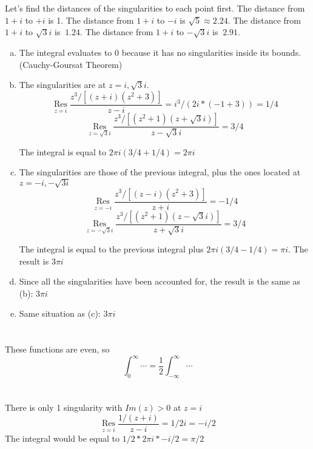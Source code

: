 \documentclass[12pt]{article}
\begin{document}
\section{}
Let's find the distances of the singularities to each point first. The distance from $ 1+i $ to $ +i $ is 1. The distance from $ 1+i $ to $ -i $ is $ \sqrt{5} \approx 2.24 $. The distance from $ 1+i $ to $ \sqrt{3}i $ is $ ~1.24 $. The distance from $ 1+i $ to $ -\sqrt{3}i $ is $ ~2.91 $. 
\begin{enumerate}[(a)]
	\item The integral evaluates to 0 because it has no singularities inside its bounds. (Cauchy-Goursat Theorem)
	
	\item The singularities are at $ z = i, \sqrt{3}i $. 
	\[ \operatorname{Res}\limits_{z=i} \dfrac{z^3/ \left[(z+i)(z^2 + 3)\right]}{z-i} = i^3 / \left(2i * (-1 + 3)\right) = 1 / 4\]
	\[ \operatorname{Res}\limits_{z=\sqrt{3}i} \dfrac{z^3/ \left[(z^2+1)(z + \sqrt{3}i)\right]}{z-\sqrt{3}i} = 3/4 \]
	
	The integral is equal to $ 2\pi i (3/4 + 1/4) = 2\pi i$
	
	\item The singularities are those of the previous integral, plus the ones located at $ z = -i, -\sqrt{3i} $
	\[ \operatorname{Res}\limits_{z=-i} \dfrac{z^3/ \left[(z-i)(z^2 + 3)\right]}{z+i} = -1/4 \]
	\[ \operatorname{Res}\limits_{z=-\sqrt{3}i} \dfrac{z^3/ \left[(z^2+1)(z - \sqrt{3}i)\right]}{z+\sqrt{3}i} = 3/4\]
	
	The integral is equal to the previous integral plus $ 2\pi i (3/4-1/4) = \pi i $. The result is $ 3\pi i $
	
	\item Since all the singularities have been accounted for, the result is the same as (b): $ 3\pi i $
	
	\item Same situation as (c): $ 3\pi i $	
\end{enumerate}
\newpage

\section{}
These functions are even, so \[ \int_{0}^{\infty} \cdots = \dfrac{1}{2}\int_{-\infty}^{\infty} \cdots  \]

\section{}
There is only 1 singularity with $ Im(z) > 0 $ at $ z = i $ 
\[\operatorname{Res}\limits_{z=i} \dfrac{1/(z+i)}{z-i} = 1/2i = -i/2\]
The integral would be equal to $ 1/2 * 2\pi i * -i/2 = \pi/2 $
\end{document}
